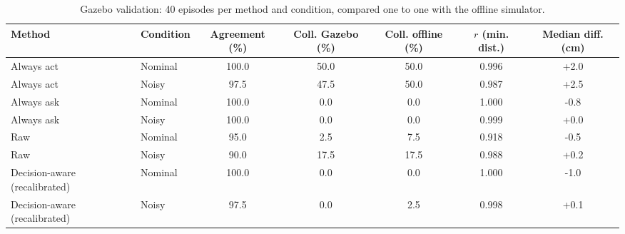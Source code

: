 \begin{table}[t]
\centering
\caption{Gazebo validation: 40 episodes per method and condition, compared one to one with the offline simulator.}
\label{tab:validation}
\begin{tabular}{llccccc}
\toprule
Method & Condition & Agreement (\%) & Coll. Gazebo (\%) & Coll. offline (\%) & $r$ (min. dist.) & Median diff. (cm) \\
\midrule
Always act & Nominal & 100.0 & 50.0 & 50.0 & 0.996 & +2.0 \\
Always act & Noisy & 97.5 & 47.5 & 50.0 & 0.987 & +2.5 \\
Always ask & Nominal & 100.0 & 0.0 & 0.0 & 1.000 & -0.8 \\
Always ask & Noisy & 100.0 & 0.0 & 0.0 & 0.999 & +0.0 \\
Raw & Nominal & 95.0 & 2.5 & 7.5 & 0.918 & -0.5 \\
Raw & Noisy & 90.0 & 17.5 & 17.5 & 0.988 & +0.2 \\
Decision-aware (recalibrated) & Nominal & 100.0 & 0.0 & 0.0 & 1.000 & -1.0 \\
Decision-aware (recalibrated) & Noisy & 97.5 & 0.0 & 2.5 & 0.998 & +0.1 \\
\bottomrule
\end{tabular}
\end{table}
